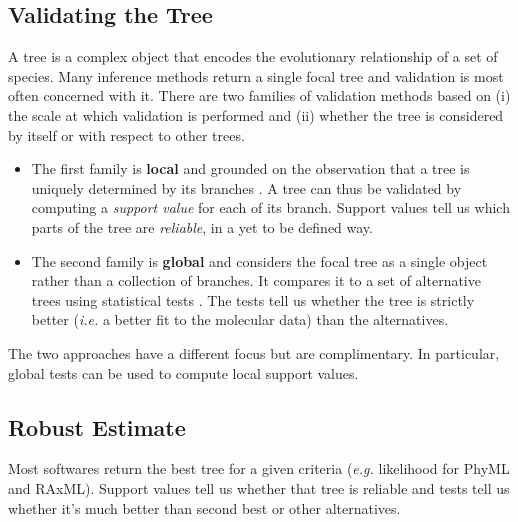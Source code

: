 
\subsection{Validating the Tree} \label{sec:tree-validation}

A tree is a complex object that encodes the evolutionary relationship of a set of species. Many inference methods return a single focal tree and validation is most often concerned with it. There are two families of validation methods based on (i) the scale at which validation is performed and (ii) whether the tree is considered by itself or with respect to other trees.

\begin{itemize}
 \item The first family is \textbf{local} and grounded on the observation that a tree is uniquely determined by its branches \citep{Buneman1971}. A tree can thus be validated by computing a \emph{support value} for each of its branch. Support values tell us which parts of the tree are \emph{reliable}, in a yet to be defined way.
 \item The second family is \textbf{global} and considers the focal tree as a single object rather than a collection of branches. It compares it to a set of alternative trees using statistical tests \citep{Shimodaira1999}. The tests tell us whether the tree is strictly better (\emph{i.e.} a better fit to the molecular data) than the alternatives.
\end{itemize}

The two approaches have a different focus but are complimentary. In particular, global tests can be used to compute local support values.

\subsection{Robust Estimate} \label{sec:robust-estimate}

Most softwares return the best tree for a given criteria (\emph{e.g.} likelihood for PhyML and RAxML). Support values tell us whether that tree is reliable and tests tell us whether it's much better than second best or other alternatives.

